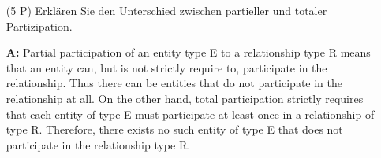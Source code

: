 \documentclass[12pt]{report}
\newcommand{\answer}{\textbf{A:}}
\begin{document}
\begin{enumerate}


\item[(5 P)] Erklären Sie den Unterschied zwischen partieller und totaler Partizipation.


\item[\answer]
  Partial participation of an entity type E to a relationship type R means that an entity can, but is not strictly require to, participate in the relationship. Thus there can be entities that do not participate in the relationship at all. On the other hand, total participation strictly requires that each entity of type E must participate at least once in a relationship of type R. Therefore, there exists no such entity of type E that does not participate in the relationship type R.

\end{enumerate}
\end{document}
